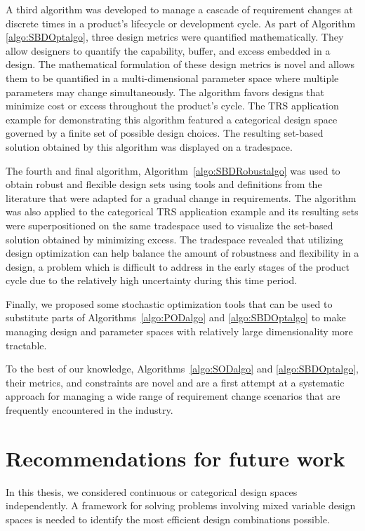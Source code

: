 A third algorithm was developed to manage a cascade of requirement chang\-es at discrete times in a product's lifecycle or development cycle. As part of Algorithm \ref{algo:SBDOptalgo}, three design metrics were quantified mathematically. They allow designers to quantify the capability, buffer, and excess embedded in a design. The mathematical formulation of these design metrics is novel and allows them to be quantified in a multi-dimensional parameter space where multiple parameters may change simultaneously. The algorithm favors designs that minimize cost or excess throughout the product's cycle. The \ac{TRS} application example for demonstrating this algorithm featured a categorical design space governed by a finite set of possible design choices. The resulting set-based solution obtained by this algorithm was displayed on a tradespace.

The fourth and final algorithm, Algorithm~\ref{algo:SBDRobustalgo} was used to obtain robust and flexible design sets using tools and definitions from the literature that were adapted for a gradual change in requirements. The algorithm was also applied to the categorical \ac{TRS} application example and its resulting sets were superpositioned on the same tradespace used to visualize the set-based solution obtained by minimizing excess. The tradespace revealed that utilizing design optimization can help balance the amount of robustness and flexibility in a design, a problem which is difficult to address in the early stages of the product cycle due to the relatively high uncertainty during this time period.

Finally, we proposed some stochastic optimization tools that can be used to substitute parts of Algorithms~\ref{algo:PODalgo} and \ref{algo:SBDOptalgo} to make managing design and parameter spaces with relatively large dimensionality more tractable.

To the best of our knowledge, Algorithms~\ref{algo:SODalgo} and \ref{algo:SBDOptalgo}, their metrics, and constraints are novel and are a first attempt at a systematic approach for managing a wide range of requirement change scenarios that are frequently encountered in the industry.

\section{Recommendations for future work}
\label{sec:futurework}

In this thesis, we considered continuous or categorical design spaces independently. A framework for solving problems involving mixed variable design spaces is needed to identify the most efficient design combinations possible. 

